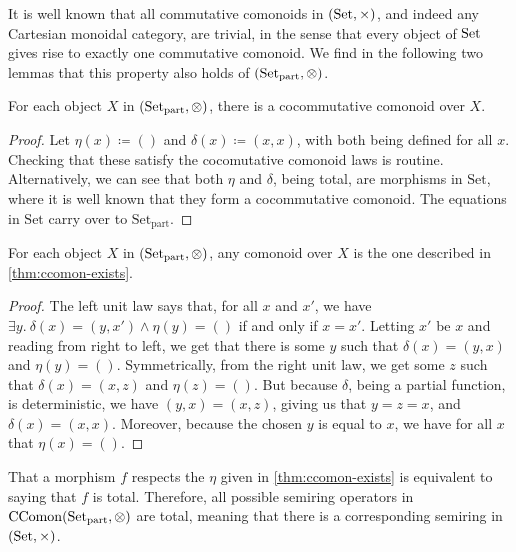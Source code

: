 It is well known that all commutative comonoids in $(\operatorname{Set}, \times)$, and indeed
any Cartesian monoidal category, are trivial, in the sense that every object of
$\operatorname{Set}$ gives rise to exactly one commutative comonoid.
We find in the following two lemmas that this property also holds of
$\plr{\Set_{\mathrm{part}}, \otimes}$.

\begin{lemma}\label{thm:ccomon-exists}
  For each object $X$ in $\plr{\Set_{\mathrm{part}}, {\otimes}}$, there is
  a cocommutative comonoid over $X$.
\end{lemma}
\begin{proof}
  Let $\eta(x) \coloneq ()$ and $\delta(x) \coloneq (x, x)$, with both
  being defined for all $x$.
  Checking that these satisfy the cocomutative comonoid laws is routine.
  Alternatively, we can see that both $\eta$ and $\delta$, being total, are
  morphisms in $\mathrm{Set}$, where it is well known that they form a
  cocommutative comonoid.
  The equations in $\mathrm{Set}$ carry over to $\mathrm{Set}_{\mathrm{part}}$.
\end{proof}

\begin{lemma}\label{thm:ccomon-unique}
  For each object $X$ in $\plr{\Set_{\mathrm{part}}, {\otimes}}$, any
  comonoid over $X$ is the one described in \cref{thm:ccomon-exists}.
\end{lemma}
\begin{proof}
  The left unit law says that, for all $x$ and $x'$, we have
  $\exists y.~\delta(x) = (y, x') \land \eta(y) = ()$ if and only if $x = x'$.
  Letting $x'$ be $x$ and reading from right to left, we get that there is
  some $y$ such that $\delta(x) = (y, x)$ and $\eta(y) = ()$.
  Symmetrically, from the right unit law, we get some $z$ such that
  $\delta(x) = (x, z)$ and $\eta(z) = ()$.
  But because $\delta$, being a partial function, is deterministic, we have
  $(y, x) = (x, z)$, giving us that $y = z = x$, and $\delta(x) = (x, x)$.
  Moreover, because the chosen $y$ is equal to $x$, we have for all $x$ that
  $\eta(x) = ()$.
\end{proof}

That a morphism $f$ respects the $\eta$ given in \cref{thm:ccomon-exists} is
equivalent to saying that $f$ is total.
Therefore, all possible semiring operators in
$\mathrm{CComon}\plr{\Set_{\mathrm{part}}, \otimes}$ are total, meaning that
there is a corresponding semiring in $\plr{\Set, \times}$.

